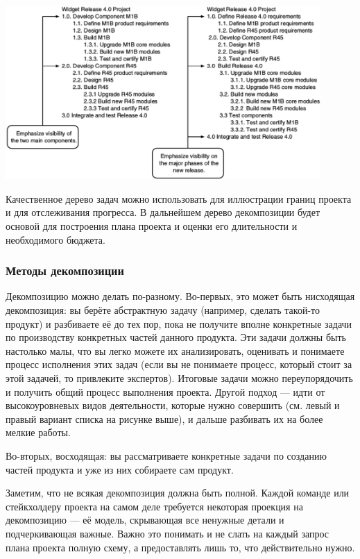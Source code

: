 \documentclass{../../text-style}
\begin{document}
\begin{center}
    \includegraphics[width=0.9\textwidth]{wbsExample2.png}
\end{center}

Качественное дерево задач можно использовать для иллюстрации границ проекта и для отслеживания прогресса. В дальнейшем дерево декомпозиции будет основой для построения плана проекта и оценки его длительности и необходимого бюджета.

\subsubsection{Методы декомпозиции}

Декомпозицию можно делать по-разному. Во-первых, это может быть нисходящая декомпозиция: вы берёте абстрактную задачу (например, сделать такой-то продукт) и разбиваете её до тех пор, пока не получите вполне конкретные задачи по производству конкретных частей данного продукта. Эти задачи должны быть настолько малы, что вы легко можете их анализировать, оценивать и понимаете процесс исполнения этих задач (если вы не понимаете процесс, который стоит за этой задачей, то привлеките экспертов). Итоговые задачи можно переупорядочить и получить общий процесс выполнения проекта. Другой подход --- идти от высокоуровневых видов деятельности, которые нужно совершить (см. левый и правый вариант списка на рисунке выше), и дальше разбивать их на более мелкие работы.

Во-вторых, восходящая: вы рассматриваете конкретные задачи по созданию частей продукта и уже из них собираете сам продукт.

Заметим, что не всякая декомпозиция должна быть полной. Каждой команде или стейкхолдеру проекта на самом деле требуется некоторая проекция на декомпозицию --- её модель, скрывающая все ненужные детали и подчеркивающая важные. Важно это понимать и не слать на каждый запрос плана проекта полную схему, а предоставлять лишь то, что действительно нужно.
\end{document}
